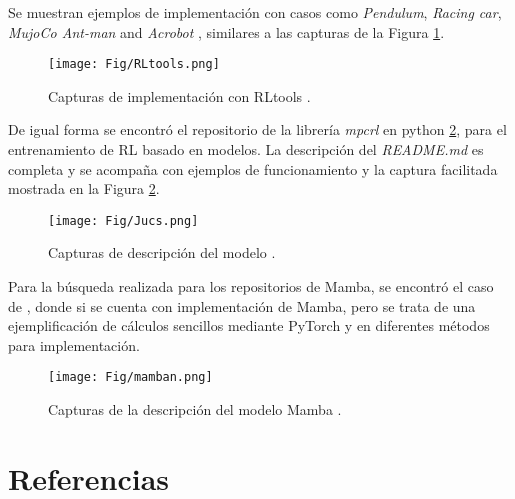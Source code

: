 \documentclass[12pt]{article}
\begin{document}
Se muestran ejemplos de implementación con casos como \textit{Pendulum}, \textit{Racing car}, \textit{MujoCo Ant-man} and \textit{Acrobot} \cite{rltools}, similares a las capturas de la Figura \ref{fig:rltools}.

\begin{figure}[h]
	\centering
	\texttt{[image: Fig/RLtools.png]}
	\caption{Capturas de implementación con RLtools \cite{rltools}.}
	\label{fig:rltools}
\end{figure}

De igual forma se encontró el repositorio de la librería \textit{mpcrl} en python \ref{fig:rlfigs}, para el entrenamiento de RL basado en modelos. La descripción del \textit{README.md} es completa y se acompaña con ejemplos de funcionamiento y la captura facilitada mostrada en la Figura \ref{fig:rlfigs}.

\begin{figure}[h]
	\centering
	\texttt{[image: Fig/Jucs.png]}
	\caption{Capturas de descripción del modelo \cite{}.}
	\label{fig:rlfigs}
\end{figure}

Para la búsqueda realizada para los repositorios de Mamba, se encontró el caso de \cite{mamban}, donde si se cuenta con implementación de Mamba, pero se trata de una ejemplificación de cálculos sencillos mediante PyTorch y en diferentes métodos para implementación.


\begin{figure}[h]
	\centering
	\texttt{[image: Fig/mamban.png]}
	\caption{Capturas de la descripción del modelo Mamba \cite{mamban}.}
	\label{fig:mamban}
\end{figure}




\newpage

\section*{Referencias}
\renewcommand\refname{}


\end{document}
